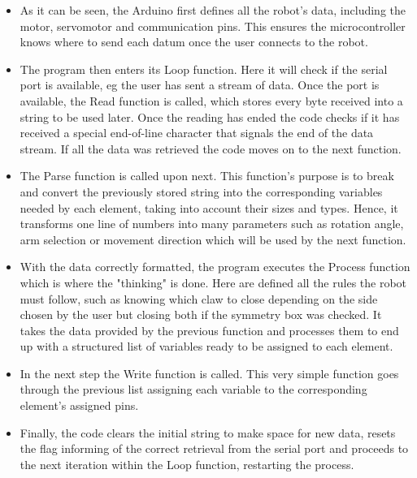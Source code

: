 	\begin{itemize}
        
	    \item As it can be seen, the Arduino first defines all the robot's data, including the motor, servomotor and communication pins. This ensures the microcontroller knows where to send each datum once the user connects to the robot.\\

		\item The program then enters its Loop function. Here it will check if the serial port is available, eg the user has sent a stream of data. Once the port is available, the Read function is called, which stores every byte received into a string to be used later. Once the reading has ended the code checks if it has received a special end-of-line character that signals the end of the data stream. If all the data was retrieved the code moves on to the next function.\\

		\item The Parse function is called upon next. This function's purpose is to break and convert the previously stored string into the corresponding variables needed by each element, taking into account their sizes and types. Hence, it transforms one line of numbers into many parameters such as rotation angle, arm selection or movement direction which will be used by the next function.\\

		\item With the data correctly formatted, the program executes the Process function which is where the "thinking" is done. Here are defined all the rules the robot must follow, such as knowing which claw to close depending on the side chosen by the user but closing both if the symmetry box was checked. It takes the data provided by the previous function and processes them to end up with a structured list of variables ready to be assigned to each element.\\

		\item In the next step the Write function is called. This very simple function goes through the previous list assigning each variable to the corresponding element's assigned pins.\\

		\item Finally, the code clears the initial string to make space for new data, resets the flag informing of the correct retrieval from the serial port and proceeds to the next iteration within the Loop function, restarting the process.\\

	\end{itemize}

